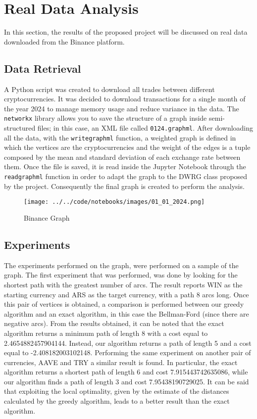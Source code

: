 \section{Real Data Analysis}\label{experiments}
In this section, the results of the proposed project will be discussed on real data downloaded from the Binance platform.
\subsection{Data Retrieval}
A Python script was created to download all trades between different cryptocurrencies. It was decided to download transactions for a single month of the year 2024 to manage memory usage and reduce variance in the data.
The \texttt{networkx} library allows you to save the structure of a graph inside semi-structured files; in this case, an XML file called \texttt{01\textunderscore 24.graphml}. 
After downloading all the data, with the \texttt{write\textunderscore graphml} function, a weighted graph is defined in which the vertices are the cryptocurrencies and the weight of the edges is a tuple composed by the mean and standard deviation of each exchange rate between them.
Once the file is saved, it is read inside the Jupyter Notebook through the \texttt{read\textunderscore graphml} function in order to adapt the graph to the DWRG class proposed by the project. Consequently the final graph is created to perform the analysis.

\begin{figure}[h!]
	\centering
	\texttt{[image: ../../code/notebooks/images/01\_01\_2024.png]} %
	\caption{Binance Graph}
	\label{graph}
\end{figure}

\subsection{Experiments}
The experiments performed on the graph, were performed on a sample of the graph.
The first experiment that was performed, was done by looking for the shortest path with the greatest number of arcs. The result reports WIN as the starting currency and ARS as the target currency, with a path 8 arcs long. Once this pair of vertices is obtained, a comparison is performed between our greedy algorithm and an exact algorithm, in this case the Bellman-Ford (since there are negative arcs).
From the results obtained, it can be noted that the exact algorithm returns a minimum path of length 8 with a cost equal to 2.4654882457904144. Instead, our algorithm returns a path of length 5 and a cost equal to -2.408182003102148. 
Performing the same experiment on another pair of currencies, AAVE and TRY a similar result is found.
In particular, the exact algorithm returns a shortest path of length 6 and cost 7.915443742635086, while our algorithm finds a path of length 3 and cost 7.95438190729025.
It can be said that exploiting the local optimality, given by the estimate of the distances calculated by the greedy algorithm, leads to a better result than the exact algorithm.

